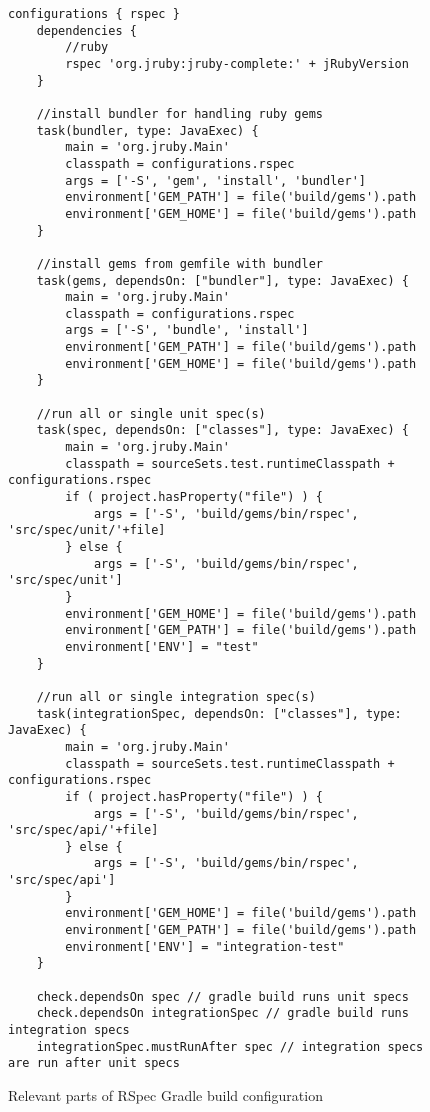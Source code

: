 \begin{figure}[H]
    \begin{lstlisting}[style=java]
    configurations { rspec }
    dependencies {
        //ruby
        rspec 'org.jruby:jruby-complete:' + jRubyVersion
    }

    //install bundler for handling ruby gems
    task(bundler, type: JavaExec) {
        main = 'org.jruby.Main'
        classpath = configurations.rspec
        args = ['-S', 'gem', 'install', 'bundler']
        environment['GEM_PATH'] = file('build/gems').path
        environment['GEM_HOME'] = file('build/gems').path
    }

    //install gems from gemfile with bundler
    task(gems, dependsOn: ["bundler"], type: JavaExec) {
        main = 'org.jruby.Main'
        classpath = configurations.rspec
        args = ['-S', 'bundle', 'install']
        environment['GEM_PATH'] = file('build/gems').path
        environment['GEM_HOME'] = file('build/gems').path
    }

    //run all or single unit spec(s)
    task(spec, dependsOn: ["classes"], type: JavaExec) {
        main = 'org.jruby.Main'
        classpath = sourceSets.test.runtimeClasspath + configurations.rspec
        if ( project.hasProperty("file") ) {
            args = ['-S', 'build/gems/bin/rspec', 'src/spec/unit/'+file]
        } else {
            args = ['-S', 'build/gems/bin/rspec', 'src/spec/unit']
        }
        environment['GEM_HOME'] = file('build/gems').path
        environment['GEM_PATH'] = file('build/gems').path
        environment['ENV'] = "test"
    }

    //run all or single integration spec(s)
    task(integrationSpec, dependsOn: ["classes"], type: JavaExec) {
        main = 'org.jruby.Main'
        classpath = sourceSets.test.runtimeClasspath + configurations.rspec
        if ( project.hasProperty("file") ) {
            args = ['-S', 'build/gems/bin/rspec', 'src/spec/api/'+file]
        } else {
            args = ['-S', 'build/gems/bin/rspec', 'src/spec/api']
        }
        environment['GEM_HOME'] = file('build/gems').path
        environment['GEM_PATH'] = file('build/gems').path
        environment['ENV'] = "integration-test"
    }

    check.dependsOn spec // gradle build runs unit specs
    check.dependsOn integrationSpec // gradle build runs integration specs
    integrationSpec.mustRunAfter spec // integration specs are run after unit specs
    \end{lstlisting}
    \caption{Relevant parts of RSpec Gradle build configuration}
    \label{fig:rspec-build}

\end{figure}
\restoregeometry


